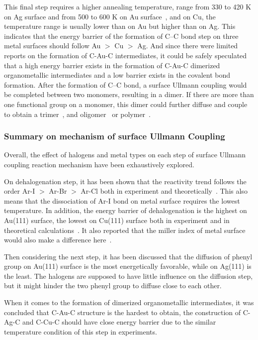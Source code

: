 \documentclass[%
 reprint,
 amsmath,amssymb,
 aps,
prb,
]{revtex4-1}
\begin{document}
This final step requires a higher annealing temperature, range from 330 to 420 K on Ag surface and from 500 to 600 K on Au surface~\cite{ullmann_51}, and on Cu, the temperature range is usually lower than on Au but higher than on Ag. This indicates that the energy barrier of the formation of C--C bond step on three metal surfaces should follow Au $>$ Cu $>$ Ag. And since  there were limited reports on the formation of C-Au-C intermediates, it could be safely speculated that a high energy barrier exists in the formation of C-Au-C dimerized organometallic intermediates and a low barrier exists in the  covalent bond formation. After the formation of C--C bond, a surface Ullmann coupling would be completed between two monomers, resulting in a dimer. If there are more than one functional group on a monomer, this dimer could further diffuse and couple to obtain a trimer~\cite{jacs2016}, and oligomer~\cite{ullmann_53, ullmann_56} or polymer~\cite{ullmann_43, ullmann_54, ullmann_55}.

\subsubsection{Summary on mechanism of surface Ullmann Coupling}

Overall, the effect of halogens and metal types on each step of surface Ullmann coupling reaction mechanism have been exhaustively explored. 

On dehalogenation step, it has been shown that the reactivity trend follows the order Ar-I $>$ Ar-Br $>$ Ar-Cl both in experiment and theoretically~\cite{ullmann_52}. This also means that the dissociation of Ar-I bond on metal surface requires the lowest temperature. In addition, the energy barrier of dehalogenation is the highest on Au(111) surface, the lowest on Cu(111) surface both in experiment and in theoretical calculations~\cite{jacs2013}. It also reported that the miller index of metal surface would also make a difference here~\cite{ullmann_57}. 

Then considering the next step, it has been discussed that the diffusion of phenyl group on Au(111) surface is the most energetically favorable, while on Ag(111) is the least. The halogens are supposed to have little influence on the diffusion step, but it might hinder the two phenyl group to diffuse close to each other. 

When it comes to the formation of dimerized organometallic intermediates, it was concluded that C-Au-C structure is the hardest to obtain, the construction of C-Ag-C and C-Cu-C should have close energy barrier due to the similar temperature condition of this step in experiments. 
\end{document}
